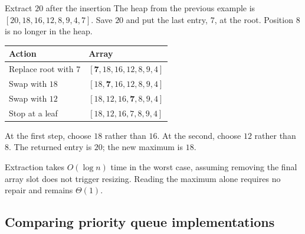 \documentclass[a4paper,12pt,oneside]{report}
\begin{document}
\begin{framedexample}{Extract $20$ after the insertion}
The heap from the previous example is
$[20,18,16,12,8,9,4,7]$. Save $20$ and put the last entry, $7$,
at the root. Position $8$ is no longer in the heap.
\begin{center}
\small
\begin{tabular}{ll}
\hline
Action & Array \\
\hline
Replace root with $7$ & $[\mathbf{7},18,16,12,8,9,4]$ \\
Swap with $18$ & $[18,\mathbf{7},16,12,8,9,4]$ \\
Swap with $12$ & $[18,12,16,\mathbf{7},8,9,4]$ \\
Stop at a leaf & $[18,12,16,7,8,9,4]$ \\
\hline
\end{tabular}
\end{center}
\begin{center}
\end{center}
At the first step, choose $18$ rather than $16$. At the second,
choose $12$ rather than $8$. The returned entry is $20$; the new
maximum is $18$.
\end{framedexample}

Extraction takes $O(\log n)$ time in the worst case, assuming
removing the final array slot does not trigger resizing.
Reading the maximum alone requires no repair and remains
$\Theta(1)$.

\subsection{Comparing priority queue implementations}
\end{document}
